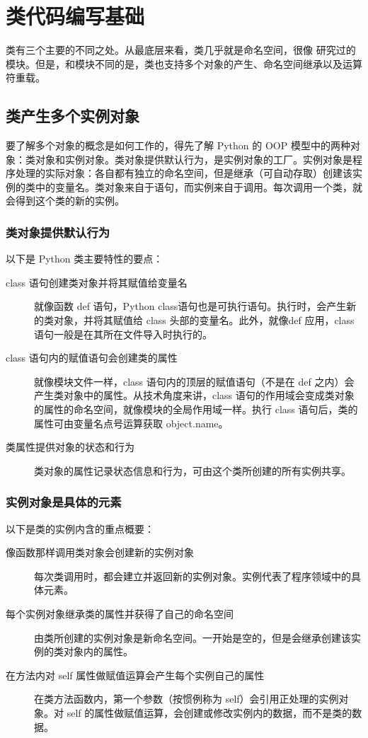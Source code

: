 \chapter{类代码编写基础\label{ch27}}
类有三个主要的不同之处。从最底层来看，类几乎就是命名空间，很像 \label{p5} 研究过的模块。但是，和模块不同的是，类也支持多个对象的产生、命名空间继承以及运算符重载。
\section{类产生多个实例对象}
要了解多个对象的概念是如何工作的，得先了解 Python 的 OOP 模型中的两种对象：类对象和实例对象。类对象提供默认行为，是实例对象的工厂。实例对象是程序处理的实际对象：各自都有独立的命名空间，但是继承（可自动存取）创建该实例的类中的变量名。类对象来自于语句，而实例来自于调用。每次调用一个类，就会得到这个类的新的实例。
\subsection{类对象提供默认行为}
以下是 Python 类主要特性的要点：
\begin{description}
    \item[class 语句创建类对象并将其赋值给变量名]就像函数 def 语句，Python class语句也是可执行语句。执行时，会产生新的类对象，并将其赋值给 class 头部的变量名。此外，就像def  应用，class 语句一般是在其所在文件导入时执行的。
    \item[class 语句内的赋值语句会创建类的属性]就像模块文件一样，class 语句内的顶层的赋值语句（不是在 def 之内）会产生类对象中的属性。从技术角度来讲，class 语句的作用域会变成类对象的属性的命名空间，就像模块的全局作用域一样。执行 class 语句后，类的属性可由变量名点号运算获取 object.name。
    \item[类属性提供对象的状态和行为]类对象的属性记录状态信息和行为，可由这个类所创建的所有实例共享。
\end{description}
\subsection{实例对象是具体的元素}
以下是类的实例内含的重点概要：
\begin{description}
    \item[像函数那样调用类对象会创建新的实例对象]每次类调用时，都会建立并返回新的实例对象。实例代表了程序领域中的具体元素。
    \item[每个实例对象继承类的属性并获得了自己的命名空间]由类所创建的实例对象是新命名空间。一开始是空的，但是会继承创建该实例的类对象内的属性。
    \item[在方法内对 self 属性做赋值运算会产生每个实例自己的属性]在类方法函数内，第一个参数（按惯例称为 self）会引用正处理的实例对象。对 self 的属性做赋值运算，会创建或修改实例内的数据，而不是类的数据。
\end{description}
